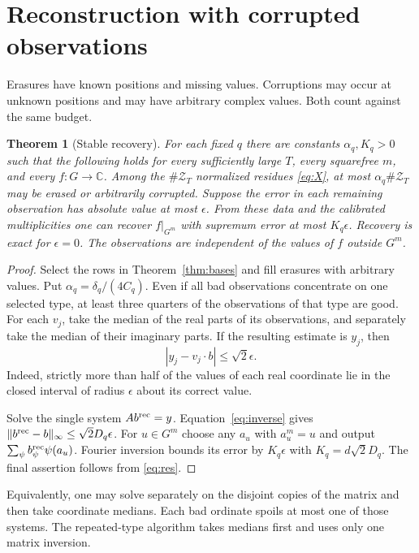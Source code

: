 \documentclass[11pt]{article}
\newtheorem{theorem}{Theorem}
\newcommand{\C}{\mathbb C}
\begin{document}
\section{Reconstruction with corrupted observations}
Erasures have known positions and missing values. Corruptions may occur at unknown positions and may have arbitrary complex values. Both count against the same budget.

\begin{theorem}[Stable recovery]\label{thm:decode}
For each fixed $q$ there are constants $\alpha_q,K_q>0$ such that the following holds for every sufficiently large $T$, every squarefree $m$, and every $f:G\to\C$. Among the $\#\mathcal Z_T$ normalized residues \eqref{eq:X}, at most $\alpha_q\#\mathcal Z_T$ may be erased or arbitrarily corrupted. Suppose the error in each remaining observation has absolute value at most $\epsilon$. From these data and the calibrated multiplicities one can recover $f|_{G^m}$ with supremum error at most $K_q\epsilon$. Recovery is exact for $\epsilon=0$. The observations are independent of the values of $f$ outside $G^m$.
\end{theorem}
\begin{proof}
Select the rows in Theorem~\ref{thm:bases} and fill erasures with arbitrary values. Put $\alpha_q=\delta_q/(4C_q)$. Even if all bad observations concentrate on one selected type, at least three quarters of the observations of that type are good. For each $v_j$, take the median of the real parts of its observations, and separately take the median of their imaginary parts. If the resulting estimate is $y_j$, then
\[
 |y_j-v_j\cdot b|\le\sqrt{2}\epsilon.
\]
Indeed, strictly more than half of the values of each real coordinate lie in the closed interval of radius $\epsilon$ about its correct value.

Solve the single system $A b^{\rm rec}=y$. Equation~\eqref{eq:inverse} gives $\|b^{\rm rec}-b\|_\infty\le\sqrt{2}D_q\epsilon$. For $u\in G^m$ choose any $a_u$ with $a_u^m=u$ and output $\sum_\psi b^{\rm rec}_\psi\psi(a_u)$. Fourier inversion bounds its error by $K_q\epsilon$ with $K_q=d\sqrt2 D_q$. The final assertion follows from \eqref{eq:res}.
\end{proof}

Equivalently, one may solve separately on the disjoint copies of the matrix and then take coordinate medians. Each bad ordinate spoils at most one of those systems. The repeated-type algorithm takes medians first and uses only one matrix inversion.
\end{document}
